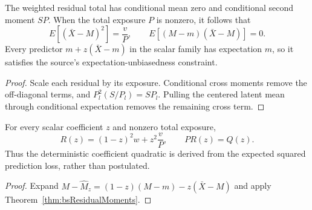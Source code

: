 \begin{theorem}\label{thm:bsResidualMoments}\leanok
{}
The weighted residual total has conditional mean zero and conditional second
moment $SP$. When the total exposure $P$ is nonzero, it follows that
\[
 E[(\bar X-M)^2]=\frac vP,
 \qquad E[(M-m)(\bar X-M)]=0.
\]
Every predictor $m+z(\bar X-m)$ in the scalar family has expectation $m$,
so it satisfies the source's expectation-unbiasedness constraint.
\end{theorem}
\begin{proof}\leanok Scale each residual by its exposure. Conditional cross
moments remove the off-diagonal terms, and
$P_l^2(S/P_l)=SP_l$. Pulling the centered latent mean through conditional
expectation removes the remaining cross term.\end{proof}

\begin{theorem}\label{thm:bsExpectedLoss}\leanok
{}
For every scalar coefficient $z$ and nonzero total exposure,
\[
  R(z)=(1-z)^2w+z^2\frac vP,
  \qquad PR(z)=Q(z).
\]
Thus the deterministic coefficient quadratic is derived from the expected
squared prediction loss, rather than postulated.
\end{theorem}
\begin{proof}\leanok Expand
$M-\widehat M_z=(1-z)(M-m)-z(\bar X-M)$ and apply
Theorem~\ref{thm:bsResidualMoments}.\end{proof}

